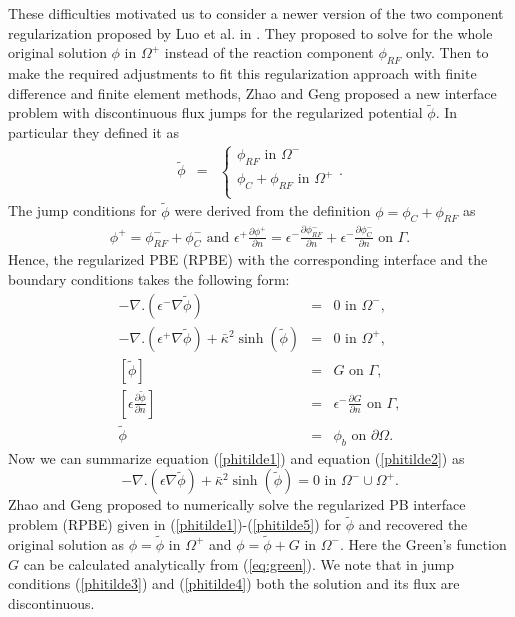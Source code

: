 These difficulties motivated us to consider a newer version of the two component regularization proposed by Luo et al. in \cite{Cai2009}. They proposed to solve for the whole original solution $\phi$ in $\Omega^+$ instead of the reaction component $\phi_{RF}$ only. Then to make the required adjustments to fit this regularization approach with finite difference and finite element methods, Zhao and Geng \cite{Geng2017a} proposed a new interface problem with discontinuous flux jumps for the regularized potential $\tilde \phi$. In particular they defined it as 
\begin{eqnarray}
	\tilde{ \phi} &=& \begin{cases}
	\phi_{RF} \text{ in } \Omega^-\\
	\phi_C + \phi_{RF} \text{ in } \Omega^+\\
	\end{cases}.
\end{eqnarray}
 The jump conditions for $\tilde\phi $ were derived from the definition $\phi=\phi_C+\phi_{RF}$ as
\begin{eqnarray}
\phi^+=\phi^-_{RF}+\phi^-_C \text{  and  } \epsilon^+ \frac{\partial \phi^+}{\partial n}=\epsilon^- \frac{\partial \phi^-_{RF}}{\partial n}+\epsilon^- \frac{\partial \phi^-_C}{\partial n} \text{ on } \Gamma.
\end{eqnarray}
Hence, the regularized PBE (RPBE) with the corresponding interface and the boundary conditions takes the following form: 
\begin{eqnarray}
	-\nabla.(\epsilon^- \nabla \tilde{ \phi}) &=& 0 \text{ in } \Omega^-,\label{phitilde1}\\ 
	-\nabla.(\epsilon^+ \nabla \tilde{ \phi}) +\bar\kappa^2 \sinh(\tilde{ \phi})&=& 0 \text{ in } \Omega^+,\label{phitilde2}\\
	\left[\tilde{ \phi}\right] &=& G \text{ on } \Gamma, \label{phitilde3}\\ 
	\left[\epsilon\frac{\partial \tilde{ \phi}}{\partial n}\right]&=& \epsilon^-  \frac{\partial G}{\partial n} \text{ on } \Gamma,\label{phitilde4}\\
	\tilde{\phi} &=& \phi_b \text{ on } \partial \Omega. \label{phitilde5}
\end{eqnarray}	
Now we can summarize equation (\ref{phitilde1}) and equation (\ref{phitilde2}) as
\begin{equation}
	-\nabla . (\epsilon \nabla \tilde{ \phi}) +\bar\kappa^2 \sinh(\tilde{ \phi})=0 \text{ in } \Omega^-\cup\Omega^+.\label{eq:RPBE}
\end{equation}
 Zhao and Geng \cite{Geng2017a} proposed to numerically solve the regularized PB interface problem (RPBE) given in (\ref{phitilde1})-(\ref{phitilde5}) for $\tilde \phi$ and recovered the original solution as $\phi= \tilde\phi $ in $\Omega^+$ and $\phi = \tilde \phi + G $ in $\Omega^-$. Here the Green's function $G$ can be calculated analytically from  (\ref{eq:green}). We note that in  jump conditions (\ref{phitilde3}) and (\ref{phitilde4}) both the solution and its flux are discontinuous. 
